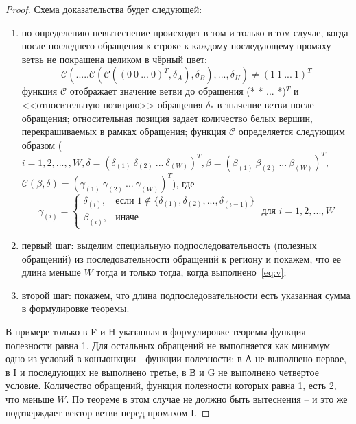 \begin{proof}
  Схема доказательства будет следующей:
  \begin{enumerate}
    \item по определению \PseudoLRU невытеснение происходит в том и только в том случае, когда после последнего обращения к строке к каждому последующему промаху ветвь не покрашена целиком в чёрный цвет:
        \begin{equation}\label{eq:v}
        \mathcal{C}(.....\mathcal{C}(\mathcal{C}( (0~0~...~0)^T, \delta_A), \delta_B), ..., \delta_H) \neq (1~1~...~1)^T
        \end{equation}
        функция $\mathcal{C}$ отображает значение ветви до обращения (* * ... *)$^T$ и <<относительную позицию>> обращения $\delta_*$ в значение ветви после обращения; относительная позиция задает количество белых вершин, перекрашиваемых в рамках обращения;
        функция $\mathcal{C}$ определяется следующим образом ($i = 1, 2, ..., , W, \delta = (\delta_{(1)}~\delta_{(2)}~...~\delta_{(W)})^T, \beta = (\beta_{(1)}~\beta_{(2)}~...~\beta_{(W)})^T,$ $\mathcal{C}(\beta, \delta) = (\gamma_{(1)}~\gamma_{(2)}~...~\gamma_{(W)})^T$), где
        $$\gamma_{(i)} = \begin{cases}\delta_{(i)} , & \text{если $1 \notin \{\delta_{(1)}, \delta_{(2)}, ..., \delta_{(i-1)}\}$}\\ \beta_{(i)}, &\text{иначе}\end{cases} \mbox{~для~}i = 1, 2,..., W$$

    \item первый шаг: выделим специальную подпоследовательность (полезных обращений) из последовательности обращений к региону и покажем, что ее длина меньше $W$ тогда и только тогда, когда выполнено~\ref{eq:v};

    \item второй шаг: покажем, что длина подпоследовательности есть указанная сумма в формулировке теоремы.
  \end{enumerate}

  В примере только в F и H указанная в формулировке теоремы функция полезности равна 1. Для остальных обращений не выполняется как минимум одно из условий в конъюнкции - функции полезности: в А не выполнено первое, в I и последующих не выполнено третье, в В и G не выполнено четвертое условие. Количество обращений, функция полезности которых равна 1, есть 2, что меньше $W$. По теореме в этом случае не должно быть вытеснения -- и это же подтверждает вектор ветви перед промахом I.


\end{proof}
